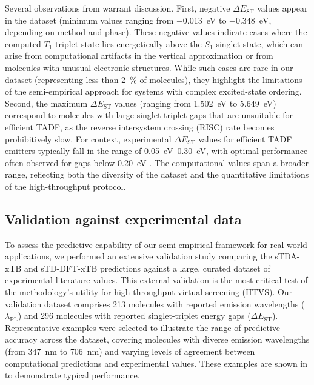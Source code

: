 \documentclass[journal=jcisd8,manuscript=article,keywords=true]{achemso}
\newcommand{\deltaest}{$\Delta E_{\text{ST}}$}
\begin{document}
Several observations from  warrant discussion. First, negative $\Delta E_{\text{ST}}$ values appear in the dataset (minimum values 
ranging from \qty{-0.013}{\electronvolt} to \qty{-0.348}{\electronvolt}, depending on method and phase). These negative values indicate cases where the 
computed $T_1$ triplet state lies energetically above the $S_1$ singlet state, which can arise from computational artifacts in the vertical approximation or 
from molecules with unusual electronic structures. While such cases are rare in our dataset (representing less than \qty{2}{\percent} of molecules), they 
highlight the limitations of the semi-empirical approach for systems with complex excited-state ordering. Second, the maximum $\Delta E_{\text{ST}}$ values 
(ranging from \qty{1.502}{\electronvolt} to \qty{5.649}{\electronvolt}) correspond to molecules with large singlet-triplet gaps that are unsuitable for 
efficient TADF, as the reverse intersystem crossing (RISC) rate becomes prohibitively slow. For context, experimental $\Delta E_{\text{ST}}$ values for 
efficient TADF emitters typically fall in the range of \qtyrange{0.05}{0.30}{\electronvolt}, with optimal performance often observed for gaps below 
\qty{0.20}{\electronvolt} \cite{Adachi2014TADF, Uoyama2012}. The computational values span a broader range, reflecting both the diversity of the dataset and the 
quantitative limitations of the high-throughput protocol.

\subsection{Validation against experimental data}\label{sec:validation}

To assess the predictive capability of our semi-empirical framework for real-world
applications, we performed an extensive validation study comparing the sTDA-xTB and
sTD-DFT-xTB predictions against a large, curated dataset of experimental literature
values. This external validation is the most critical test of the methodology's utility
for high-throughput virtual screening (HTVS). Our validation dataset comprises \num{213}
molecules with reported emission wavelengths ($\lambda_{\text{PL}}$) and \num{296}
molecules with reported singlet-triplet energy gaps (\deltaest). Representative examples were selected to illustrate the range of predictive accuracy across 
the dataset, covering molecules with diverse emission wavelengths (from \qty{347}{\nano\meter} to \qty{706}{\nano\meter}) and varying levels of agreement 
between computational predictions and experimental values. These examples are shown in  to demonstrate typical performance.
\end{document}
